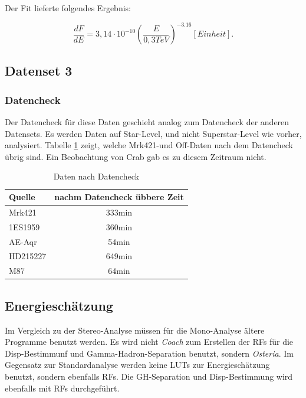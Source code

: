 Der Fit lieferte folgendes Ergebnis:

\begin{equation}
 \frac{dF}{dE}=3,14 \cdot 10^{-10}\left( \frac{E}{0,3 \si{TeV}} \right)^{-3.16} [Einheit].
\end{equation}


\FloatBarrier

\subsection{Datenset 3}
\label{subsec:Datenset_3}

\subsubsection{Datencheck}
Der Datencheck für diese Daten geschieht analog zum Datencheck der anderen Datensets.
Es werden Daten auf Star-Level, und nicht Superstar-Level wie vorher, analysiert.
Tabelle \ref{tab:Datenset3} zeigt, welche Mrk421-und Off-Daten nach dem Datencheck übrig sind.
Ein Beobachtung von Crab gab es zu diesem Zeitraum nicht.

\begin{table}[!h]
\centering
\caption{Daten nach Datencheck}
\label{tab:Datenset3}
\begin{tabular}{lc}
  \toprule
  Quelle & nachm Datencheck übbere Zeit\\
  \midrule
  \midrule
  Mrk421 & 333min\\
  \midrule
  1ES1959 & 360min \\
  AE-Aqr & 54min  \\
  HD215227 & 649min \\
  M87 & 64min \\
  \bottomrule
  \bottomrule
\end{tabular}
\end{table}

\subsection{Energieschätzung}
Im Vergleich zu der Stereo-Analyse müssen für die Mono-Analyse ältere Programme benutzt werden.
Es wird nicht \textit{Coach} zum Erstellen der RFs für die Disp-Bestimmunf und Gamma-Hadron-Separation benutzt, sondern \textit{Osteria}.
Im Gegensatz zur Standardanalyse werden keine LUTs zur Energieschätzung benutzt, sondern ebenfalls RFs.
Die GH-Separation und Disp-Bestimmung wird ebenfalls mit RFs durchgeführt.


